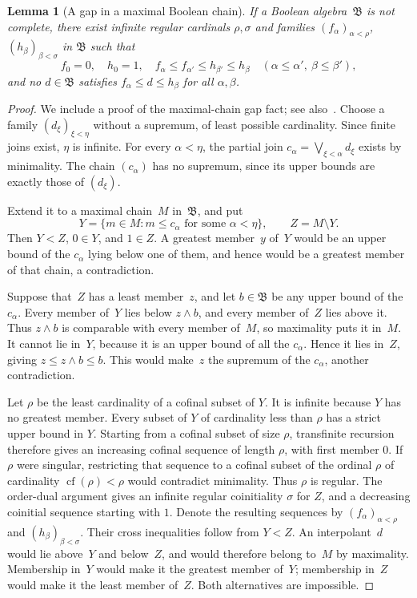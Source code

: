 \documentclass[preprint,12pt,nopreprintline]{elsarticle}
\newtheorem{lemma}[theorem]{Lemma}
\theoremstyle{definition}
\theoremstyle{remark}
\numberwithin{equation}{section}
\begin{document}
\begin{lemma}[A gap in a maximal Boolean chain]
\label{tcp:lem:boolean-gap}
If a Boolean algebra~$\mathfrak B$ is not complete, there exist infinite regular cardinals $\rho,\sigma$ and families
$(f_\alpha)_{\alpha<\rho}$, $(h_\beta)_{\beta<\sigma}$ in $\mathfrak B$ such that
\[
 f_0=0,\quad h_0=1,\quad
 f_\alpha\le f_{\alpha'}\le h_{\beta'}\le h_\beta
 \quad(\alpha\le\alpha',\ \beta\le\beta'),
\]
and no $d\in\mathfrak B$ satisfies
$f_\alpha\le d\le h_\beta$ for all $\alpha,\beta$.
\end{lemma}

\begin{proof}
We include a proof of the maximal-chain gap fact; see also~\cite[p.~344]{Monk}. Choose a family $(d_\xi)_{\xi<\eta}$ without a supremum, of least possible cardinality. Since finite joins exist, $\eta$ is infinite. For every $\alpha<\eta$, the partial join $c_\alpha=\bigvee_{\xi<\alpha}d_\xi$ exists by minimality. The chain $(c_\alpha)$ has no supremum, since its upper bounds are exactly those of $(d_\xi)$.

Extend it to a maximal chain~$M$ in~$\mathfrak B$, and put
\[
 Y=\{m\in M:m\le c_\alpha\text{ for some }\alpha<\eta\}, \qquad Z=M\setminus Y.
\]
Then $Y<Z$, $0\in Y$, and $1\in Z$. A greatest member~$y$ of~$Y$ would be an upper bound of the $c_\alpha$ lying below one of them, and hence would be a greatest member of that chain, a contradiction.

Suppose that~$Z$ has a least member~$z$, and let $b\in\mathfrak B$ be any upper bound of the $c_\alpha$. Every member of~$Y$ lies below $z\wedge b$, and every member of~$Z$ lies above it. Thus $z\wedge b$ is comparable with every member of~$M$, so maximality
puts it in~$M$. It cannot lie in~$Y$, because it is an upper bound of all the $c_\alpha$. Hence it lies in~$Z$, giving
$z\le z\wedge b\le b$. This would make~$z$ the supremum of the $c_\alpha$, another contradiction.

Let $\rho$ be the least cardinality of a cofinal subset of $Y$. It is infinite because $Y$ has no greatest member. Every subset of
$Y$ of cardinality less than $\rho$ has a strict upper bound in $Y$. Starting from a cofinal subset of size $\rho$, transfinite recursion therefore gives an increasing cofinal sequence of length $\rho$, with first member $0$. If $\rho$ were singular, restricting that sequence to a cofinal subset of the ordinal $\rho$ of cardinality $\operatorname{cf}(\rho)<\rho$ would contradict minimality. Thus $\rho$ is regular. The order-dual argument gives an infinite regular coinitiality $\sigma$ for $Z$, and a decreasing coinitial sequence starting with $1$. Denote the resulting sequences by $(f_\alpha)_{\alpha<\rho}$ and $(h_\beta)_{\beta<\sigma}$. Their cross inequalities follow from $Y<Z$. An interpolant~$d$ would lie above~$Y$ and below~$Z$, and would therefore belong to~$M$ by maximality. Membership in~$Y$ would make it the greatest member of~$Y$; membership in~$Z$ would make it the least member of~$Z$. Both alternatives are impossible.
\end{proof}
\end{document}
